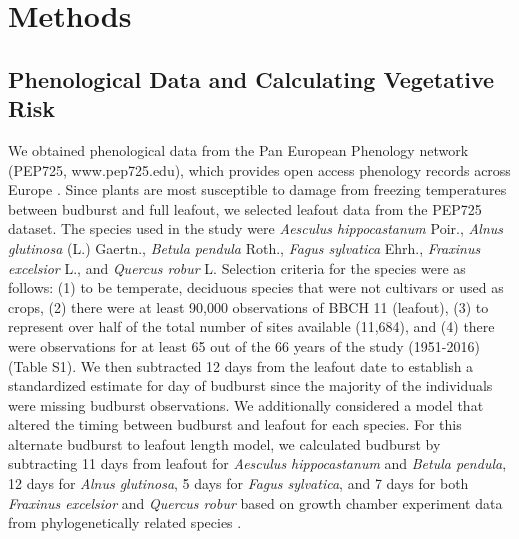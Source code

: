 \documentclass{article}\usepackage[]{graphicx}\usepackage[]{color}
\begin{document}
\section*{Methods} 
\subsection*{Phenological Data and Calculating Vegetative Risk}
We obtained phenological data from the Pan European Phenology network (PEP725, www.pep725.edu), which provides open access phenology records across Europe \citep{Templ2018}. Since plants are most susceptible to damage from freezing temperatures between budburst and full leafout, we selected leafout data \citep[i.e., in][BBCH 11, which is defined as the point of leaf unfolding and the first visible leaf stalk]{Meier2001} from the PEP725 dataset. The species used in the study were \textit{Aesculus hippocastanum} Poir., \textit{Alnus glutinosa} (L.) Gaertn., \textit{Betula pendula} Roth., \textit{Fagus sylvatica} Ehrh., \textit{Fraxinus excelsior} L., and \textit{Quercus robur} L. Selection criteria for the species were as follows: (1) to be temperate, deciduous species that were not cultivars or used as crops, (2) there were at least 90,000 observations of BBCH 11 (leafout), (3) to represent over half of the total number of sites available (11,684), and (4) there were observations for at least 65 out of the 66 years of the study (1951-2016) (Table S1). We then subtracted 12 days from the leafout date to establish a standardized estimate for day of budburst \citep{Donnelly2017, Flynn2018, NPN2019} since the majority of the individuals were missing budburst observations. 
We additionally considered a model that altered the timing between budburst and leafout for each species. For this alternate budburst to leafout length model, we calculated budburst by subtracting 11 days from leafout for \textit{Aesculus hippocastanum} and \textit{Betula pendula}, 12 days for \textit{Alnus glutinosa}, 5 days for \textit{Fagus sylvatica}, and 7 days for both \textit{Fraxinus excelsior} and \textit{Quercus robur} based on growth chamber experiment data from phylogenetically related species \citep{Buerki2010, Wang2016, Hipp2017, Flynn2018}.
\end{document}
